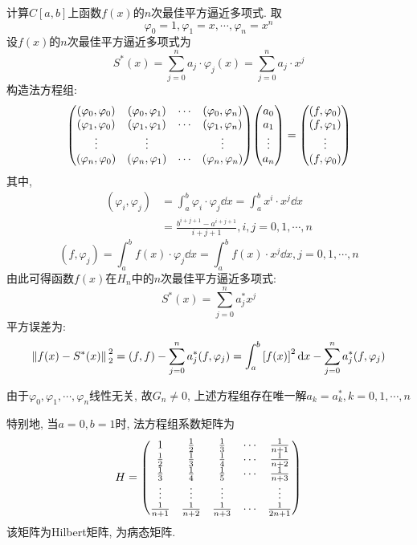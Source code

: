 计算$C[a,b]$上函数$f(x)$的$n$次最佳平方逼近多项式. 取
\begin{equation*}
    \varphi_0=1, \varphi_1=x,\cdots,\varphi_n=x^n
\end{equation*}
设$f(x)$的$n$次最佳平方逼近多项式为
\begin{equation*}
    S^*(x)=\sum_{j=0}^na_j\cdot\varphi_j(x)=\sum_{j=0}^na_j\cdot x^j
\end{equation*}
构造法方程组:
\begin{equation*}
    \mqty(
        (\varphi_0,\varphi_0)&(\varphi_0,\varphi_1)&\cdots&(\varphi_0,\varphi_n)\\
        (\varphi_1,\varphi_0)&(\varphi_1,\varphi_1)&\cdots&(\varphi_1,\varphi_n)\\
        \vdots&\vdots& &\vdots\\
        (\varphi_n,\varphi_0)&(\varphi_n,\varphi_1)&\cdots&(\varphi_n,\varphi_n)\\
    )\mqty(
        a_0\\a_1\\\vdots\\a_n
    )=\mqty(
        (f,\varphi_0)\\(f,\varphi_1)\\\vdots\\(f,\varphi_0)
    )
\end{equation*}
其中, 
\begin{align*}
    (\varphi_i,\varphi_j)&=\int_a^b\varphi_i\cdot\varphi_j\dd{x}=\int_a^bx^i\cdot x^j\dd{x}\\
    &=\frac{b^{i+j+1}-a^{i+j+1}}{i+j+1}, i,j=0,1,\cdots,n
\end{align*}
\begin{equation*}
    (f,\varphi_j)=\int_a^bf(x)\cdot\varphi_j\dd{x}=\int_a^bf(x)\cdot x^j\dd{x}, j=0,1,\cdots,n
\end{equation*}
由此可得函数$f(x)$在$H_n$中的$n$次最佳平方逼近多项式:
\begin{equation*}
    S^*(x)=\sum_{j=0}^na_j^*x^j
\end{equation*}
平方误差为:
\begin{equation*}
    \norm*{f(x)-S^*(x)}_2^2=(f,f)-\sum_{j=0}^na_j^*(f,\varphi_j)=\int_a^b\left[f(x)\right]^2\dd{x}-\sum_{j=0}^na_j^*(f,\varphi_j)
\end{equation*}

由于$\varphi_0,\varphi_1,\cdots,\varphi_n$线性无关, 故$G_n\ne 0$, 上述方程组存在唯一解$a_k=a_k^*, k=0,1,\cdots,n$

特别地, 当$a=0,b=1$时, 法方程组系数矩阵为
\begin{equation*}
    H=\mqty(
        1&\frac{1}{2}&\frac{1}{3}&\cdots&\frac{1}{n+1}\\
        \frac{1}{2}&\frac{1}{3}&\frac{1}{4}&\cdots&\frac{1}{n+2}\\
        \frac{1}{3}&\frac{1}{4}&\frac{1}{5}&\cdots&\frac{1}{n+3}\\
        \vdots&\vdots&\vdots& &\vdots\\
        \frac{1}{n+1}&\frac{1}{n+2}&\frac{1}{n+3}&\cdots&\frac{1}{2n+1}\\
    )
\end{equation*}
该矩阵为Hilbert矩阵, 为病态矩阵.

